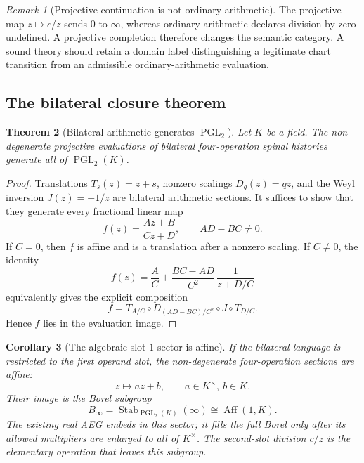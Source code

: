 \documentclass[11pt]{article}
\newtheorem{theorem}{Theorem}[section]
\newtheorem{corollary}[theorem]{Corollary}
\theoremstyle{definition}
\theoremstyle{remark}
\newtheorem{remark}[theorem]{Remark}
\newcommand{\PGL}{\operatorname{PGL}}
\newcommand{\Aff}{\operatorname{Aff}}
\newcommand{\Stab}{\operatorname{Stab}}
\begin{document}
\begin{remark}[Projective continuation is not ordinary arithmetic]
The projective map \(z\mapsto c/z\) sends \(0\) to \(\infty\), whereas ordinary
arithmetic declares division by zero undefined.  A projective completion
therefore changes the semantic category.  A sound theory should retain a
domain label distinguishing a legitimate chart transition from an admissible
ordinary-arithmetic evaluation.
\end{remark}

\subsection{The bilateral closure theorem}

\begin{theorem}[Bilateral arithmetic generates \(\PGL_2\)]
\label{thm:bilateral-pgl}
Let \(K\) be a field.  The non-degenerate projective evaluations of bilateral
four-operation spinal histories generate all of \(\PGL_2(K)\).
\end{theorem}

\begin{proof}
Translations \(T_s(z)=z+s\), nonzero scalings \(D_q(z)=qz\), and the Weyl
inversion \(J(z)=-1/z\) are bilateral arithmetic sections.  It suffices to
show that they
generate every fractional linear map
\[
f(z)=\frac{Az+B}{Cz+D},
\qquad AD-BC\neq0.
\]
If \(C=0\), then \(f\) is affine and is a translation after a nonzero scaling.
If \(C\neq0\), the identity
\begin{equation}
f(z)
=
\frac{A}{C}
+
\frac{BC-AD}{C^2}\,
\frac{1}{z+D/C}
\label{eq:mobius-decomposition}
\end{equation}
equivalently gives the explicit composition
\[
f=T_{A/C}\circ D_{(AD-BC)/C^2}\circ J\circ T_{D/C}.
\]
Hence \(f\) lies in the evaluation image.
\end{proof}

\begin{corollary}[The algebraic slot-\(1\) sector is affine]
If the bilateral language is restricted to the first operand slot, the
non-degenerate four-operation sections are affine:
\[
z\mapsto az+b,\qquad a\in K^\times,\ b\in K.
\]
Their image is the Borel subgroup
\[
B_\infty=\Stab_{\PGL_2(K)}(\infty)\cong\Aff(1,K).
\]
The existing real AEG embeds in this sector; it fills the full Borel only after
its allowed multipliers are enlarged to all of \(K^\times\).
The second-slot division \(c/z\) is the elementary operation that leaves this
subgroup.
\end{corollary}
\end{document}
